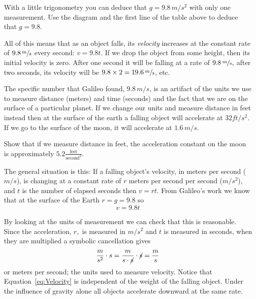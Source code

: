 \pagebreak[4]
\begin{ProficiencyDrill}
  With a little trigonometry you can deduce that $g=9.8\,m/s^2$
  with only one measurement.  Use the diagram and the first line of the
  table above to deduce that $g=9.8.$\\
\end{ProficiencyDrill}

All of this means that as an object falls, its \emph{velocity} increases at
the constant rate of \(9.8\, \sfrac{m}{s}\) every second: $v=9.8t.$ If
we drop the object from some height, then its initial velocity is
zero.  After one second it will be falling at a rate of
\(9.8\,\sfrac{m}{s},\) after two seconds, its velocity will be
$9.8\times2=19.6\,\sfrac{m}{s}$, etc.

The specific number that Galileo found, $9.8\,m/s$, is an artifact of
the units we use to measure distance (meters) and time (seconds) and
the fact that we are on the surface of a particular planet.  If we
change our units and measure distance in feet instead then at the
surface of the earth a falling object will accelerate at $32 ft/s^2.$
If we go to  the surface of the moon, it will accelerate at
$1.6\, m/s.$


  \begin{ProficiencyDrill-1line}{}
    Show that if we measure distance in feet, the acceleration constant
    on the moon is approximately $5.2 \frac{\text{feet}}{\text{second}^2}.$
  \end{ProficiencyDrill-1line}
  
The general situation is this: If a falling object's velocity, in meters per second
($m/s$), is changing at a constant rate of $r$ meters per second per
second ($m/s^2$), and $t$ is the number of elapsed seconds then
$ v=rt.$ From Galileo's work we know that at the surface of the Earth
$r=g=9.8$ so
\begin{equation}
  v=9.8t
 \label{eq:Velocity}
\end{equation}

By looking at the units of measurement we can check that this is
reasonable. Since the acceleration, $r,$ is measured in $m/s^2$ and
$t$ is measured in seconds, when they are multiplied a symbolic
cancellation gives
$$
\frac{m}{s^2}\cdot s = \frac{m}{s\cdot \cancel{s}}\cdot \cancel{s} = \frac{m}{s}
$$
or meters per second; the units used to measure
velocity. Notice that Equation~\ref{eq:Velocity} is independent of the weight of the
falling object. Under the influence of gravity alone all objects
accelerate downward at the
same rate.




